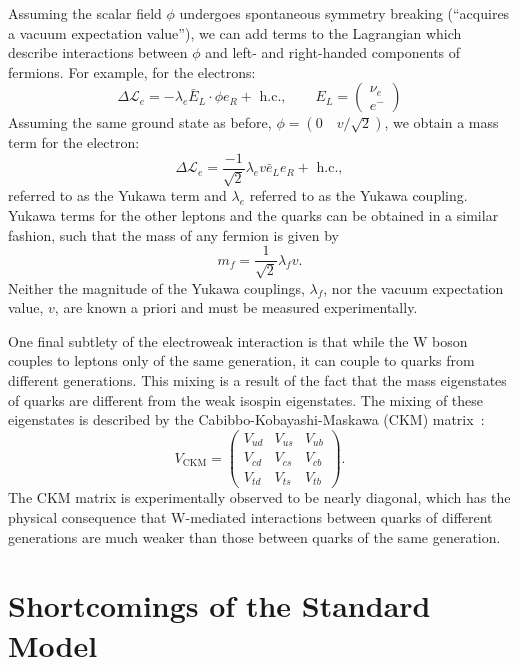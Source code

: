 Assuming the scalar field $\phi$ undergoes spontaneous symmetry breaking (``acquires a vacuum expectation value''), we can add terms to the Lagrangian which describe interactions between $\phi$ and left- and right-handed components of fermions.
For example, for the electrons:
\begin{equation}
\Delta \mathcal L_e = - \lambda_e \bar{E}_L \cdot \phi e_R + \text{ h.c.}, \qquad E_L = \begin{pmatrix} \nu_e \\ e^- \end{pmatrix} 
\end{equation}
Assuming the same ground state as before, $\phi = (0 \quad v/\sqrt{2})$, we obtain a mass term for the electron:
\begin{equation}
    \Delta \mathcal L_e = \frac{-1}{\sqrt{2}} \lambda_e v \bar{e}_L e_R + \text{ h.c.},
\end{equation}
referred to as the Yukawa term and $\lambda_e$ referred to as the Yukawa coupling.
Yukawa terms for the other leptons and the quarks can be obtained in a similar fashion, such that the mass of any fermion is given by
\begin{equation}
    m_f = \frac{1}{\sqrt{2}} \lambda_f v.
\end{equation}
Neither the magnitude of the Yukawa couplings, $\lambda_f$, nor the vacuum expectation value, $v$, are known a priori and must be measured experimentally.

One final subtlety of the electroweak interaction is that while the W boson couples to leptons only of the same generation, it can couple to quarks from different generations.
This mixing is a result of the fact that the mass eigenstates of quarks are different from the weak isospin eigenstates.
The mixing of these eigenstates is described by the Cabibbo-Kobayashi-Maskawa (CKM) matrix~\cite{Cabibbo:1963yz,Kobayashi:1973fv}:
\begin{equation}
V_{\text{CKM}} = \begin{pmatrix} V_{ud} & V_{us} & V_{ub} \\ V_{cd} & V_{cs} & V_{cb} \\ V_{td} & V_{ts} & V_{tb} \end{pmatrix}.
\end{equation}
The CKM matrix is experimentally observed to be nearly diagonal, which has the physical consequence that W-mediated interactions between quarks of different generations are much weaker than those between quarks of the same generation.

\section{Shortcomings of the Standard Model} \label{sec:theory_sm_problems}

